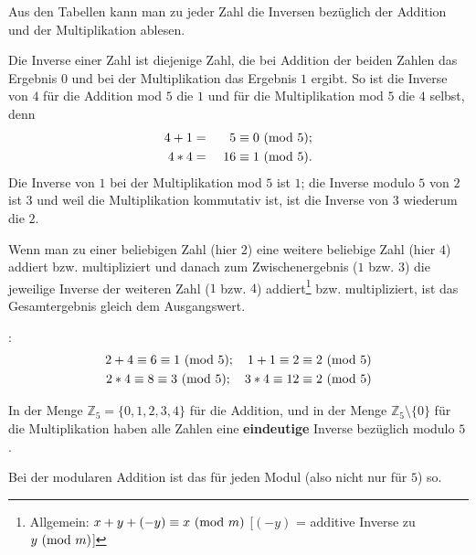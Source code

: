 \begin{refsegment}
Aus den Tabellen kann man zu jeder Zahl die Inversen bezüglich der Addition
und der Multiplikation ablesen.

Die Inverse einer Zahl ist diejenige Zahl, die bei Addition der beiden
Zahlen das Ergebnis $0$ und bei der Multiplikation das Ergebnis $1$ ergibt. So
ist die Inverse von $4$ für die Addition mod $5$ die $1$ und für die
Multiplikation mod $5$ die $4$ selbst, denn
\begin{alignat}{2}
4 + 1 &  =  & 5 & \equiv 0 {\rm ~(mod~ } 5); \nonumber\\
4 * 4 &  = & ~16 & \equiv 1 {\rm ~(mod~ } 5). \nonumber
\end{alignat}
Die Inverse von $1$ bei der Multiplikation mod $5$ ist $1$; die Inverse modulo $5$
von $2$ ist $3$ und weil die Multiplikation kommutativ ist, ist die Inverse von
$3$ wiederum die $2$.

Wenn man zu einer beliebigen Zahl (hier $2$) eine weitere beliebige Zahl (hier $4$) addiert bzw.
multipliziert und danach zum Zwischenergebnis ($1$ bzw. $3$)
die jeweilige Inverse der weiteren Zahl ($1$ bzw. $4$)
addiert\footnote{%
Allgemein: $x + y + (-y) \equiv x{\rm ~(mod~}m)$ [$(-y)$ = additive Inverse zu $y{\rm ~(mod~}m)$]
} bzw. multipliziert,
ist das Gesamtergebnis gleich dem Ausgangswert.

\begin{example}{:}
\begin{eqnarray*}
2 + 4 \equiv 6 \equiv 1 {\rm ~(mod~ } 5) ; \quad 1 + 1 \equiv 2 \equiv 2 {\rm ~(mod~ } 5)  \nonumber\\
2 * 4 \equiv 8 \equiv 3 {\rm ~(mod~ } 5) ; \quad 3 * 4 \equiv 12 \equiv 2 {\rm ~(mod~ } 5) \nonumber
\end{eqnarray*}
\end{example}


In der Menge $\mathbb{Z}_5 = \{0, 1, 2, 3, 4\}$ für die Addition, und in der
Menge $\mathbb{Z}_5 \setminus \{ 0\}$  für die Multiplikation haben alle Zahlen
eine \textbf{eindeutige} Inverse bezüglich modulo $5$.

Bei der modularen Addition ist das für jeden Modul (also nicht nur für $5$)
so.


\end{refsegment}
